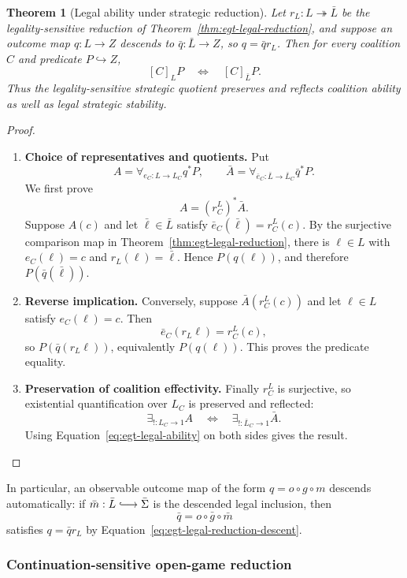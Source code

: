 \documentclass[11pt,a4paper]{article}
\numberwithin{equation}{section}
\newtheorem{theorem}{Theorem}[section]
\theoremstyle{definition}
\theoremstyle{remark}
\theoremstyle{plain}
\begin{document}
\begin{theorem}[Legal ability under strategic reduction]
\label{thm:egt-legal-ability-reduction}
Let $r_L:L\twoheadrightarrow\bar L$ be the legality-sensitive reduction of
Theorem~\ref{thm:egt-legal-reduction}, and suppose an outcome map
$q:L\to Z$ descends to $\bar q:\bar L\to Z$, so $q=\bar q r_L$. Then for
every coalition $C$ and predicate $P\hookrightarrow Z$,
\[
 [C]_L P
 \quad\Longleftrightarrow\quad
 [C]_{\bar L}P.
\]
Thus the legality-sensitive strategic quotient preserves and reflects
coalition ability as well as legal strategic stability.
\end{theorem}
\begin{proof}
\leavevmode
\begin{enumerate}[label=\textup{(\arabic*)},leftmargin=*,itemsep=4pt,topsep=3pt]
  \item \textbf{Choice of representatives and quotients.} Put
\[
 A=\forall_{e_C:L\to L_C}q^*P,
 \qquad
 \bar A=\forall_{\bar e_C:\bar L\to\bar L_C}\bar q^*P.
\]
We first prove
\[
 A=(r_C^L)^*\bar A.
\]
Suppose $A(c)$ and let $\bar\ell\in\bar L$ satisfy
$\bar e_C(\bar\ell)=r_C^L(c)$. By the surjective comparison map in
Theorem~\ref{thm:egt-legal-reduction}, there is $\ell\in L$ with
$e_C(\ell)=c$ and $r_L(\ell)=\bar\ell$. Hence $P(q(\ell))$, and therefore
$P(\bar q(\bar\ell))$.
  \item \textbf{Reverse implication.} Conversely, suppose $\bar A(r_C^L(c))$ and let $\ell\in L$ satisfy
$e_C(\ell)=c$. Then
\[
 \bar e_C(r_L\ell)=r_C^L(c),
\]
so $P(\bar q(r_L\ell))$, equivalently $P(q(\ell))$. This proves the
predicate equality.
  \item \textbf{Preservation of coalition effectivity.} Finally $r_C^L$ is surjective, so existential quantification over $L_C$ is
preserved and reflected:
\[
 \exists_{!:L_C\to1}A
 \quad\Longleftrightarrow\quad
 \exists_{!:\bar L_C\to1}\bar A.
\]
Using Equation~\eqref{eq:egt-legal-ability} on both sides gives the result.
\end{enumerate}
\end{proof}

In particular, an observable outcome map of the form
$q=o\circ g\circ m$ descends automatically: if
$\bar m:\bar L\lhook\joinrel\longrightarrow\bar\Sigma$ is the descended
legal inclusion, then
\[
 \bar q=o\circ\bar g\circ\bar m
\]
satisfies $q=\bar q r_L$ by
Equation~\eqref{eq:egt-legal-reduction-descent}.

\subsubsection{Continuation-sensitive open-game reduction}
\end{document}

